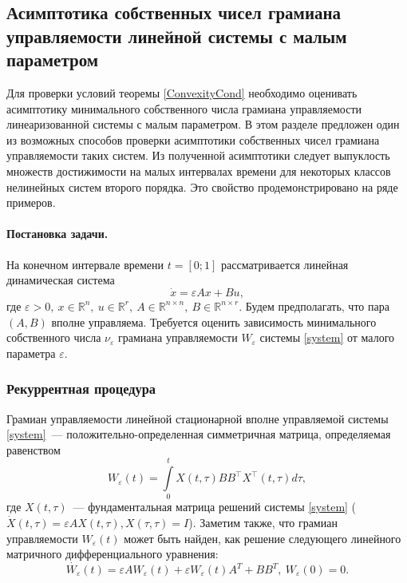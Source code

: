 \documentclass[../main.tex]{subfiles}
\begin{document}
 \subsection{Асимптотика собственных чисел грамиана управляемости линейной системы с малым параметром} 
 Для проверки условий теоремы \ref{ConvexityCond} необходимо оценивать асимптотику минимального собственного числа грамиана управляемости линеаризованной системы с малым параметром. В этом разделе предложен один из возможных способов проверки асимптотики собственных чисел грамиана управляемости таких систем. Из полученной асимптотики следует выпуклость множеств достижимости на малых интервалах времени для некоторых классов нелинейных систем второго порядка. Это свойство продемонстрировано на ряде примеров.
 \paragraph{Постановка задачи.} На конечном интервале времени $ t = [0;1] $ рассматривается линейная динамическая система 
 \begin{equation}\label{system}
	 \dot{x} = \varepsilon A x + Bu, 
 \end{equation}
 где $ \varepsilon > 0, \ x \in \mathbb{R}^n, \ u \in \mathbb{R}^r, \ A \in \mathbb{R}^{n\times n}, \ B \in \mathbb{R}^{n\times r}  $. Будем предполагать, что пара $ \left( A, B\right)  $ вполне управляема. Требуется оценить зависимость минимального собственного числа $ \nu_{\varepsilon} $ грамиана управляемости $ W_{\varepsilon} $ системы \eqref{system} от малого параметра $ \varepsilon  $.
 \subsubsection{Рекуррентная процедура}
 Грамиан управляемости линейной стационарной вполне управляемой системы \eqref{system}~--- положительно-определенная симметричная матрица, определяемая равенством
 \begin{equation*}
	 W_{\varepsilon}(t) = \int \limits_0^t X(t,\tau) B B^{\top} X^{\top}(t,\tau) d\tau,
 \end{equation*}
 где $ X(t,\tau) $~--- фундаментальная матрица решений системы \eqref{system} ($  \dot{X}(t,\tau) = \varepsilon A X(t,\tau), X(\tau,\tau) = I  $).
 Заметим также, что грамиан управляемости $ W_{\varepsilon}(t) $ может быть найден, как решение следующего линейного матричного дифференциального уравнения:
 \begin{equation}\label{gram}
	 \dot{W_{\varepsilon}}(t) = \varepsilon A W_{\varepsilon}(t) + \varepsilon W_{\varepsilon}(t) A^T + BB^T, \ W_{\varepsilon}(0) = 0.
 \end{equation}
 
\end{document}
